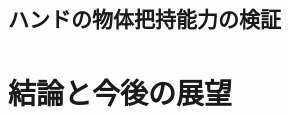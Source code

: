 \documentclass{jarticle}
\begin{document}
\subsection{ハンドの物体把持能力の検証}


\section{結論と今後の展望}

\footnotesize





\normalsize
\end{document}
